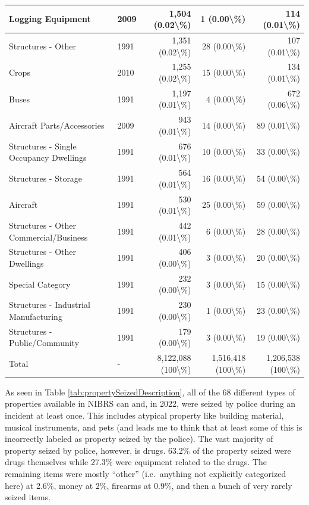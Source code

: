 \documentclass[
]{krantz}
\begin{document}
\begin{longtable}[t]{l|l|r|r|r}
\hline
Logging Equipment & 2009 & 1,504 (0.02\textbackslash{}\%) & 1 (0.00\textbackslash{}\%) & 114 (0.01\textbackslash{}\%)\\
\hline
Structures - Other & 1991 & 1,351 (0.02\textbackslash{}\%) & 28 (0.00\textbackslash{}\%) & 107 (0.01\textbackslash{}\%)\\
\hline
Crops & 2010 & 1,255 (0.02\textbackslash{}\%) & 15 (0.00\textbackslash{}\%) & 134 (0.01\textbackslash{}\%)\\
\hline
Buses & 1991 & 1,197 (0.01\textbackslash{}\%) & 4 (0.00\textbackslash{}\%) & 672 (0.06\textbackslash{}\%)\\
\hline
Aircraft Parts/Accessories & 2009 & 943 (0.01\textbackslash{}\%) & 14 (0.00\textbackslash{}\%) & 89 (0.01\textbackslash{}\%)\\
\hline
Structures - Single Occupancy Dwellings & 1991 & 676 (0.01\textbackslash{}\%) & 10 (0.00\textbackslash{}\%) & 33 (0.00\textbackslash{}\%)\\
\hline
Structures - Storage & 1991 & 564 (0.01\textbackslash{}\%) & 16 (0.00\textbackslash{}\%) & 54 (0.00\textbackslash{}\%)\\
\hline
Aircraft & 1991 & 530 (0.01\textbackslash{}\%) & 25 (0.00\textbackslash{}\%) & 59 (0.00\textbackslash{}\%)\\
\hline
Structures - Other Commercial/Business & 1991 & 442 (0.01\textbackslash{}\%) & 6 (0.00\textbackslash{}\%) & 28 (0.00\textbackslash{}\%)\\
\hline
Structures - Other Dwellings & 1991 & 406 (0.00\textbackslash{}\%) & 3 (0.00\textbackslash{}\%) & 20 (0.00\textbackslash{}\%)\\
\hline
Special Category & 1991 & 232 (0.00\textbackslash{}\%) & 3 (0.00\textbackslash{}\%) & 15 (0.00\textbackslash{}\%)\\
\hline
Structures - Industrial Manufacturing & 1991 & 230 (0.00\textbackslash{}\%) & 1 (0.00\textbackslash{}\%) & 23 (0.00\textbackslash{}\%)\\
\hline
Structures - Public/Community & 1991 & 179 (0.00\textbackslash{}\%) & 3 (0.00\textbackslash{}\%) & 19 (0.00\textbackslash{}\%)\\
\hline
Total & - & 8,122,088 (100\textbackslash{}\%) & 1,516,418 (100\textbackslash{}\%) & 1,206,538 (100\textbackslash{}\%)\\
\hline
\end{longtable}

As seen in Table \ref{tab:propertySeizedDescription}, all of
the 68 different types of properties available in NIBRS can
and, in 2022, were seized by police during an incident at
least once. This includes atypical property like building
material, musical instruments, and pets (and leads me to
think that at least some of this is incorrectly labeled as
property seized by the police). The vast majority of
property seized by police, however, is drugs. 63.2\% of the
property seized were drugs themselves while 27.3\% were
equipment related to the drugs. The remaining items were
mostly ``other'' (i.e.~anything not explicitly categorized
here) at 2.6\%, money at 2\%, firearms at 0.9\%, and then a
bunch of very rarely seized items.
\end{document}
